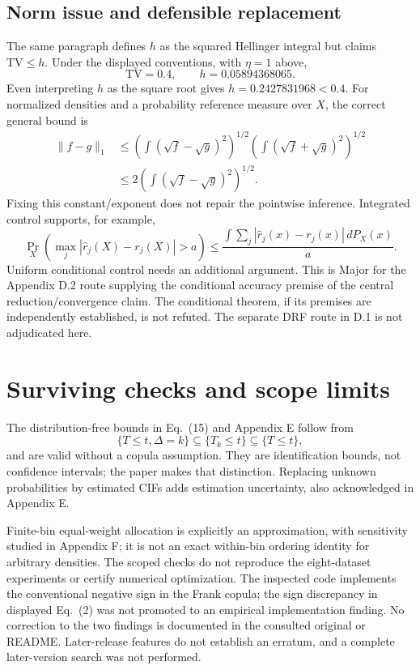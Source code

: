 \documentclass[10pt]{article}
\begin{document}
\subsection*{Norm issue and defensible replacement}
The same paragraph defines \(h\) as the squared Hellinger integral but claims \(\mathrm{TV}\leq h\). Under the displayed conventions, with \(\eta=1\) above, \[\mathrm{TV}=0.4,\qquad h=0.05894368065.\] Even interpreting \(h\) as the square root gives \(h=0.2427831968<0.4\). For normalized densities and a probability reference measure over \(X\), the correct general bound is \[\begin{aligned}
 \|f-g\|_1
 &\leq \left(\int(\sqrt f-\sqrt g)^2\right)^{1/2}
       \left(\int(\sqrt f+\sqrt g)^2\right)^{1/2}\\
 &\leq2\left(\int(\sqrt f-\sqrt g)^2\right)^{1/2}.\end{aligned}\] Fixing this constant/exponent does not repair the pointwise inference. Integrated control supports, for example, \[\Pr_X\!\left(\max_j|\widehat r_j(X)-r_j(X)|>a\right)
 \leq \frac{\int\sum_j|\widehat r_j(x)-r_j(x)|\,dP_X(x)}{a}.\] Uniform conditional control needs an additional argument. This is Major for the Appendix D.2 route supplying the conditional accuracy premise of the central reduction/convergence claim. The conditional theorem, if its premises are independently established, is not refuted. The separate DRF route in D.1 is not adjudicated here.\par
\section*{Surviving checks and scope limits}
The distribution-free bounds in Eq. (15) and Appendix E follow from \[\{T\leq t,\Delta=k\}\subseteq\{T_k\leq t\}
 \subseteq\{T\leq t\},\] and are valid without a copula assumption. They are identification bounds, not confidence intervals; the paper makes that distinction. Replacing unknown probabilities by estimated CIFs adds estimation uncertainty, also acknowledged in Appendix E.\par
Finite-bin equal-weight allocation is explicitly an approximation, with sensitivity studied in Appendix F; it is not an exact within-bin ordering identity for arbitrary densities. The scoped checks do not reproduce the eight-dataset experiments or certify numerical optimization. The inspected code implements the conventional negative sign in the Frank copula; the sign discrepancy in displayed Eq. (2) was not promoted to an empirical implementation finding. No correction to the two findings is documented in the consulted original or README. Later-release features do not establish an erratum, and a complete later-version search was not performed.\par
\end{document}
